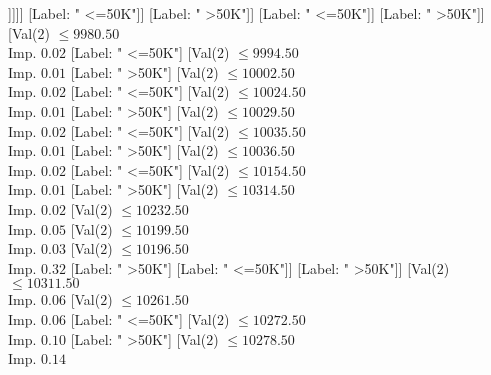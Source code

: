 \documentclass[margin=10pt]{standalone}
\begin{document}
\begin{forest}
																						[Val($2$) $ \leq 9870.50$ \\ Imp. $0.20$
																							[Label: " >50K"]
																							[Val($2$) $ \leq 9875.50$ \\ Imp. $0.92$
																								[Label: " <=50K"]
																								[Label: " >50K"]]]]]
																				[Label: " <=50K"]]
																			[Label: " >50K"]]
																		[Label: " <=50K"]]
																	[Label: " >50K"]]
																[Val($2$) $ \leq 9980.50$ \\ Imp. $0.02$
																	[Label: " <=50K"]
																	[Val($2$) $ \leq 9994.50$ \\ Imp. $0.01$
																		[Label: " >50K"]
																		[Val($2$) $ \leq 10002.50$ \\ Imp. $0.02$
																			[Label: " <=50K"]
																			[Val($2$) $ \leq 10024.50$ \\ Imp. $0.01$
																				[Label: " >50K"]
																				[Val($2$) $ \leq 10029.50$ \\ Imp. $0.02$
																					[Label: " <=50K"]
																					[Val($2$) $ \leq 10035.50$ \\ Imp. $0.01$
																						[Label: " >50K"]
																						[Val($2$) $ \leq 10036.50$ \\ Imp. $0.02$
																							[Label: " <=50K"]
																							[Val($2$) $ \leq 10154.50$ \\ Imp. $0.01$
																								[Label: " >50K"]
																								[Val($2$) $ \leq 10314.50$ \\ Imp. $0.02$
																									[Val($2$) $ \leq 10232.50$ \\ Imp. $0.05$
																										[Val($2$) $ \leq 10199.50$ \\ Imp. $0.03$
																											[Val($2$) $ \leq 10196.50$ \\ Imp. $0.32$
																												[Label: " >50K"]
																												[Label: " <=50K"]]
																											[Label: " >50K"]]
																										[Val($2$) $ \leq 10311.50$ \\ Imp. $0.06$
																											[Val($2$) $ \leq 10261.50$ \\ Imp. $0.06$
																												[Label: " <=50K"]
																												[Val($2$) $ \leq 10272.50$ \\ Imp. $0.10$
																													[Label: " >50K"]
																													[Val($2$) $ \leq 10278.50$ \\ Imp. $0.14$

\end{forest}
\end{document}
